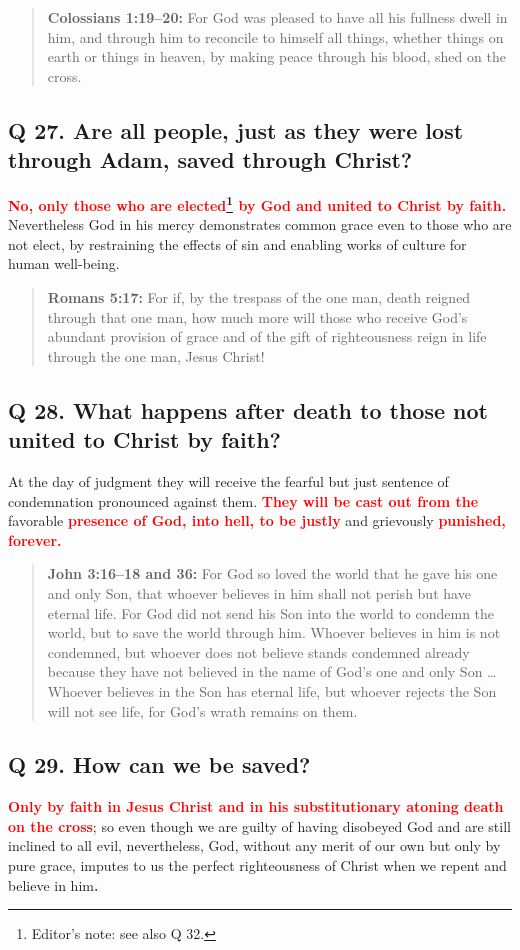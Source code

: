 \documentclass[]{memoir}
\newcommand\Children[1]{\textbf{\textcolor{red}{#1}}}
\newcommand\Quote[2]{\begin{quote}{\textbf{#1:}{ #2}}\end{quote}}
\begin{document}
\Quote{Colossians 1:19--20}{For God was pleased to have all his fullness dwell in him, and through him to reconcile to himself all things, whether things on earth or things in heaven, by making peace through his blood, shed on the cross.}

\subsection{Q 27. Are all people, just as they were lost through Adam, saved through Christ?}
\Children{No, only those who are elected\footnote{Editor's note: see also Q 32.} by God and united to Christ by faith.} Nevertheless God in his mercy demonstrates common grace even to those who are not elect, by restraining the effects of sin and enabling works of culture for human well-being.

\Quote{Romans 5:17}{For if, by the trespass of the one man, death reigned through that one man, how much more will those who receive God's abundant provision of grace and of the gift of righteousness reign in life through the one man, Jesus Christ!}

\subsection{Q 28. What happens after death to those not united to Christ by faith?}
At the day of judgment they will receive the fearful but just sentence of condemnation pronounced against them. \Children{They will be cast out from the} favorable \Children{presence of God, into hell, to be justly} and grievously \Children{punished, forever.}

\Quote{John 3:16--18 and 36\index[joh]{03:36@3:36}}{For God so loved the world that he gave his one and only Son, that whoever believes in him shall not perish but have eternal life. For God did not send his Son into the world to condemn the world, but to save the world through him. Whoever believes in him is not condemned, but whoever does not believe stands condemned already because they have not believed in the name of God's one and only Son {\dots} Whoever believes in the Son has eternal life, but whoever rejects the Son will not see life, for God's wrath remains on them.}

\subsection{Q 29. How can we be saved?}
\Children{Only by faith in Jesus Christ and in his substitutionary atoning death on the cross}; so even though we are guilty of having disobeyed God and are still inclined to all evil, nevertheless, God, without any merit of our own but only by pure grace, imputes to us the perfect righteousness of Christ when we repent and believe in him\Children{.}
\end{document}
